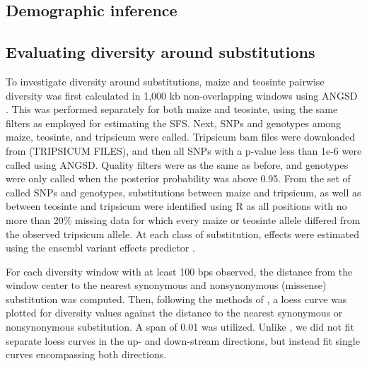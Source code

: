 \documentclass{pnastwo}
\begin{document}
\begin{article}
\begin{materials}
\subsection{Demographic inference}

\subsection{Evaluating diversity around substitutions}
To investigate diversity around substitutions, maize and teosinte pairwise diversity was first
calculated in 1,000 kb non-overlapping windows using ANGSD
\cite{korneliussen2014}. This was performed separately for both maize and
teosinte, using the same filters as employed for estimating the
SFS. Next, SNPs and genotypes among maize, teosinte, and tripsicum were called. Tripsicum bam files
were downloaded from (TRIPSICUM FILES), and then all SNPs with a
p-value less than 1e-6 were called using ANGSD. Quality filters were
as the same as before, and genotypes were only called when the
posterior probability was above 0.95. From the set of called SNPs and
genotypes, substitutions between maize and tripsicum, as well as
between teosinte and tripsicum were identified using R \cite{R2014} as all positions with
no more than 20\% missing data for which every maize or teosinte
allele differed from the observed tripsicum allele. At each class of
substitution, effects were estimated using the ensembl variant effects
predictor \cite{mclaren2010}.

For each diversity window with at least 100 bps observed, the distance from the window center to the
nearest synonymous and nonsynonymous (missense) substitution was
computed. Then, following the methods of \cite{hernandez2011}, a loess
curve was plotted for diversity values against the distance to the
nearest synonymous or nonsynonymous substitution. A span of 0.01 was
utilized. Unlike
\cite{sattath2011}, we did not fit separate loess curves in the up- and
down-stream directions, but instead fit single curves encompassing
both directions.


\end{materials}
\end{article}
\end{document}
